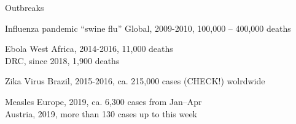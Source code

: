 \documentclass[table]{beamer}\usepackage[]{graphicx}\usepackage[]{color}
\begin{document}
{
%
%
\begin{frame}[fragile]{Outbreaks}

\begin{block} {Influenza pandemic ``swine flu''}
Global, 2009-2010, 100,000 -- 400,000 deaths
\end{block}
\begin{block} {Ebola}
West Africa, 2014-2016, 11,000 deaths \\
DRC, since 2018, 1,900 deaths
\end{block}
\begin{block} {Zika Virus}
Brazil, 2015-2016, ca. 215,000 cases (CHECK!) wolrdwide
\end{block}
\begin{block} {Measles}
Europe, 2019, ca. 6,300 cases from Jan--Apr \\ %
Austria, 2019, more than 130 cases up to this week
\end{block}

\end{frame}
}
\end{document}
